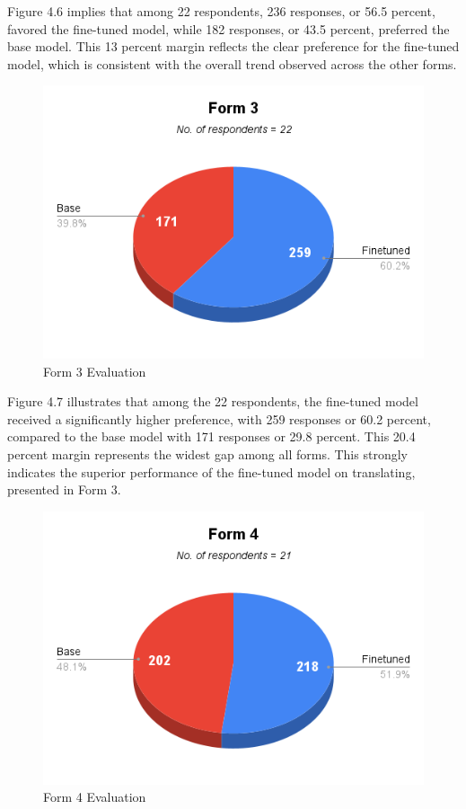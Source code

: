 Figure 4.6 implies that among 22 respondents, 236 responses, or 56.5 percent, favored the fine-tuned model, while 182 responses, or 43.5 percent, preferred the base model. This 13 percent margin reflects the clear preference for the fine-tuned model, which is consistent with the overall trend observed across the other forms. 

\begin{figure}[H]
	\caption{Form 3 Evaluation}
	\centering
	\includegraphics[scale=0.7]{figures/Form3.png}
\end{figure}

Figure 4.7 illustrates that among the 22 respondents, the fine-tuned model received a significantly higher preference, with 259 responses or 60.2 percent, compared to the base model with 171 responses or 29.8 percent. This 20.4 percent margin represents the widest gap among all forms. This strongly indicates the superior performance of the fine-tuned model on translating, presented in Form 3. 

\begin{figure} [H]
	\caption{Form 4 Evaluation}
	\centering
	\includegraphics[scale=0.7]{figures/Form4.png}
\end{figure}

